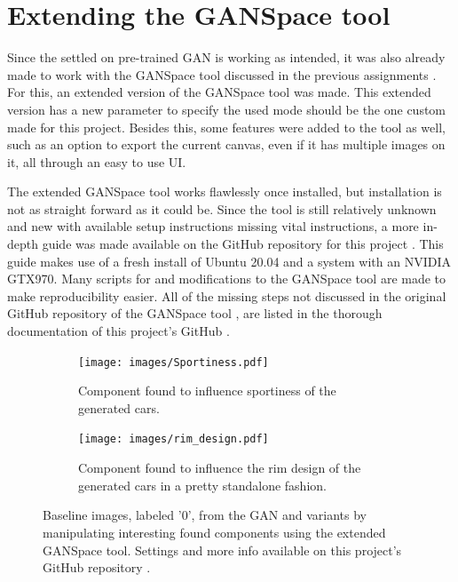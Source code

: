 \section{Extending the GANSpace tool}
\label{sec:ganspace_extended}

Since the settled on pre-trained GAN is working as intended, it was also already made to work with the GANSpace tool discussed in the previous assignments \citep{ganspace}.
For this, an extended version of the GANSpace tool was made.
This extended version has a new parameter to specify the used mode should be the one custom made for this project.
Besides this, some features were added to the tool as well, such as an option to export the current canvas, even if it has multiple images on it, all through an easy to use UI.

The extended GANSpace tool works flawlessly once installed, but installation is not as straight forward as it could be.
Since the tool is still relatively unknown and new with available setup instructions missing vital instructions, a more in-depth guide was made available on the GitHub repository for this project \citep{github_project}.
This guide makes use of a fresh install of Ubuntu 20.04 and a system with an NVIDIA GTX970.
Many scripts for and modifications to the GANSpace tool are made to make reproducibility easier.
All of the missing steps not discussed in the original GitHub repository of the GANSpace tool \citep{ganspace_git}, are listed in the thorough documentation of this project's GitHub \citep{github_project}. 


\begin{figure}
\begin{subfigure}{.45\textwidth}
  \centering
  \texttt{[image: images/Sportiness.pdf]}
  \caption{Component found to influence sportiness of the generated cars.}
  \label{fig:sportiness}
\end{subfigure}%
\hspace{.04\textwidth}
\begin{subfigure}{.45\textwidth}
  \centering
  \texttt{[image: images/rim\_design.pdf]}
  \caption{Component found to influence the rim design of the generated cars in a pretty standalone fashion.}
  \label{fig:rimdesign}
\end{subfigure}
\centering
\captionsetup{width=.85\linewidth}
\caption{Baseline images, labeled '0', from the GAN and variants by manipulating interesting found components using the extended GANSpace tool. Settings and more info available on this project's GitHub repository \citep{github_project}.}
\label{fig:ganspaceexports}
\end{figure}